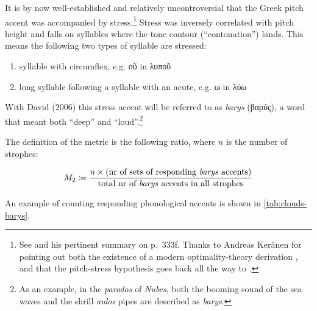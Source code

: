 \documentclass[twoside]{article}
\begin{document}
It is by now well-established and relatively uncontroversial that the Greek pitch accent was accompanied by stress.\footnote{See \textcite{allenAccentRhythmProsodic1973} and his pertinent summary on p.\ 333f. Thanks to Andreas Keränen for pointing out both the existence of a modern optimality-theory derivation \parencite{blumenfeldTonetoStressStresstoToneAncient2004}, and that the pitch-stress hypothesis goes back all the way to \textcite{hilbergPrincipSilbenwagungUnd1879}.}
Stress was inversely correlated with pitch height and falls on syllables where the tone contour (``contonation'') lands. This means the following two types of syllable are stressed:
\begin{enumerate}
    \item syllable with circumflex, e.g. \textgreek{οῦ} in \textgreek{λυποῦ}
    \item long syllable following a syllable with an acute, e.g. \textgreek{ω} in \textgreek{λύω}
\end{enumerate}

With David (2006) this stress accent will be referred to as \textit{barys} (\textgreek{βαρύς}), a word that meant both ``deep'' and ``loud''.\footnote{As an example, in the \textit{parodos} of \textit{Nubes}, both the booming sound of the sea waves and the shrill \textit{aulos} pipes are described as \textit{barys}.}

The definition of the metric is the following ratio, where $n$ is the number of strophes:

\[
M_2 \coloneqq \frac{n \times \text{(nr of sets of responding \textit{barys} accents)}}{\text{total nr of \textit{barys} accents in all strophes}}
\]

An example of counting responding phonological accents is shown in \autoref{tab:clouds-barys}.
\end{document}

